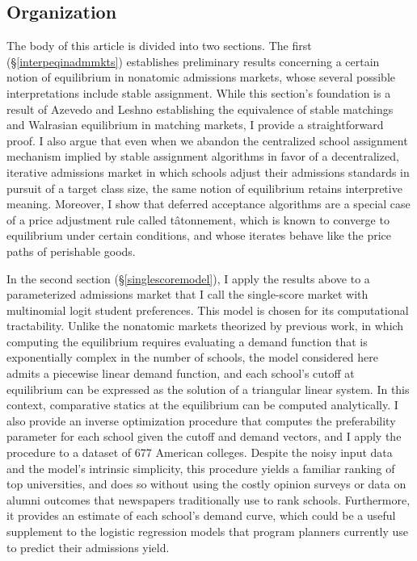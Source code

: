 \documentclass[12pt]{article}
\numberwithin{equation}{subsection}
\theoremstyle{definition}
\begin{document}
\subsection{Organization}
The body of this article is divided into two sections. The first (\S\ref{interpeqinadmmkts}) establishes preliminary results concerning a certain notion of equilibrium in nonatomic admissions markets, whose several possible interpretations include stable assignment. While this section's foundation is a result of Azevedo and Leshno \parencite*{supplydemandfw} establishing the equivalence of stable matchings and Walrasian equilibrium in matching markets, I provide a straightforward proof. I also argue that even when we abandon the centralized school assignment mechanism implied by stable assignment algorithms in favor of a decentralized, iterative admissions market in which schools adjust their admissions standards in pursuit of a target class size, the same notion of equilibrium retains interpretive meaning. Moreover, I show that deferred acceptance algorithms are a special case of a price adjustment rule called t\^{a}tonnement, which is known to converge to equilibrium under certain conditions, and whose iterates behave like the price paths of perishable goods. 

In the second section (\S\ref{singlescoremodel}), I apply the results above to a parameterized admissions market that I call the single-score market with multinomial logit student preferences. This model is chosen for its computational tractability. Unlike the nonatomic markets theorized by previous work, in which computing the equilibrium requires evaluating a demand function that is exponentially complex in the number of schools, the model considered here admits a piecewise linear demand function, and each school's cutoff at equilibrium can be expressed as the solution of a triangular linear system. In this context, comparative statics at the equilibrium can be computed analytically. I also provide an inverse optimization procedure that computes the preferability parameter for each school given the cutoff and demand vectors, and I apply the procedure to a dataset of 677 American colleges. Despite the noisy input data and the model's intrinsic simplicity, this procedure yields a familiar ranking of top universities, and does so without using the costly opinion surveys or data on alumni outcomes that newspapers traditionally use to rank schools. Furthermore, it provides an estimate of each school's demand curve, which could be a useful supplement to the logistic regression models that program planners currently use to predict their admissions yield.
\end{document}
